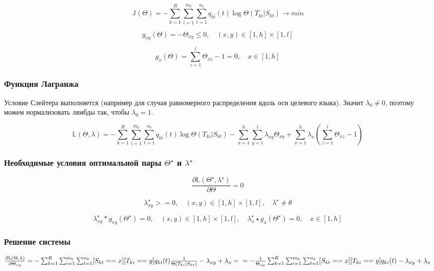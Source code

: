 \documentclass[10pt]{article}
\begin{document}
	$$ \mathbb{J} (\Theta) = - \sum_{k=1}^R \sum_{i=1}^{m_k} \sum_{t=1}^{n_k} q_{ki}(t) \log \Theta(T_{ki} | S_{kt}) \rightarrow min $$
	
	$$ g_{xy}(\Theta) = -\Theta_{xy} \leq 0, \quad (x, y) \in [1, h] \times [1, l]
	$$
	
	$$ g_x(\Theta) = \sum_{z=1}^{l} \Theta_{xz} - 1 = 0, \quad x \in [1, h]
	$$
	
	
	\subsubsection*{Функция Лагранжа}
	
	Условие Слейтера выполняется (например для случая равномерного распределения вдоль оси целевого языка). Значит $\lambda_0 \ne 0$, поэтому можем нормализовать лямбды так, чтобы $\lambda_0 = 1$. 
	
	$$ \mathbb{L}(\Theta, \lambda) = - \sum_{k=1}^R \sum_{i=1}^{m_k} \sum_{t=1}^{n_k} q_{ki}(t) \log \Theta(T_{ki} | S_{kt})
	- \sum_{x=1}^{h} \sum_{y=1}^{l} \lambda_{xy} \Theta_{xy}
	+ \sum_{x=1}^{h} \lambda_x (\sum_{z=1}^{l} \Theta_{xz} - 1)
	$$
	
	\subsubsection*{Необходимые условия оптимальной пары $\Theta^{\star}$ и $\lambda^{\star}$}
	
	$$ \frac{\partial \mathbb{L} (\Theta^{\star}, \lambda^{\star})} {\partial \Theta} = 0
	$$
	
	$$ \lambda_{xy}^{\star} >= 0, \quad (x, y) \in [1, h] \times [1, l], \quad \lambda^{\star} \ne \theta
	$$
	
	$$\lambda_{xy}^{\star} * g_{xy}(\Theta^{\star}) = 0, \quad (x, y) \in [1, h] \times [1, l], \quad \lambda_x^{\star} \star g_{x}(\Theta^{\star}) = 0, \quad x \in [1, h]
	$$
	
	\subsubsection*{Решение системы}
	
	$  \frac{\partial \mathbb{L} (\Theta, \lambda)} {\partial \Theta_{xy}} =
	- \sum_{k=1}^R \sum_{i=1}^{m_k} \sum_{t=1}^{n_k} [S_{kt}==x] [T_{ki} == y] q_{ki}(t) \frac{1}{\Theta(T_{ki} | S_{kt})}
	- \lambda_{xy} + \lambda_x =\\
	= - \frac{1}{\Theta_{xy}} \sum_{k=1}^R \sum_{i=1}^{m_k} \sum_{t=1}^{n_k} [S_{kt}==x][T_{ki} == y] q_{ki}(t)
	- \lambda_{xy} + \lambda_x$
	
\end{document}
